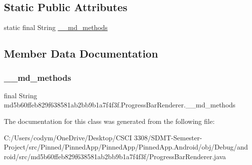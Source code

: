 \subsection*{Static Public Attributes}
\begin{DoxyCompactItemize}
\item 
static final String \hyperlink{classmd5b60ffeb829f638581ab2bb9b1a7f4f3f_1_1_progress_bar_renderer_a81813d61865c0e1c93ba13fd369721ab}{\+\_\+\+\_\+md\+\_\+methods}
\end{DoxyCompactItemize}


\subsection{Member Data Documentation}
\mbox{\label{classmd5b60ffeb829f638581ab2bb9b1a7f4f3f_1_1_progress_bar_renderer_a81813d61865c0e1c93ba13fd369721ab}} 
\subsubsection{\texorpdfstring{\+\_\+\+\_\+md\+\_\+methods}{\_\_md\_methods}}
{\footnotesize\ttfamily final String md5b60ffeb829f638581ab2bb9b1a7f4f3f.\+Progress\+Bar\+Renderer.\+\_\+\+\_\+md\+\_\+methods\hspace{0.3cm}{\ttfamily [static]}}



The documentation for this class was generated from the following file\+:\begin{DoxyCompactItemize}
\item 
C\+:/\+Users/codym/\+One\+Drive/\+Desktop/\+C\+S\+C\+I 3308/\+S\+D\+M\+T-\/\+Semester-\/\+Project/src/\+Pinned/\+Pinned\+App/\+Pinned\+App/\+Pinned\+App.\+Android/obj/\+Debug/android/src/md5b60ffeb829f638581ab2bb9b1a7f4f3f/Progress\+Bar\+Renderer.\+java\end{DoxyCompactItemize}
